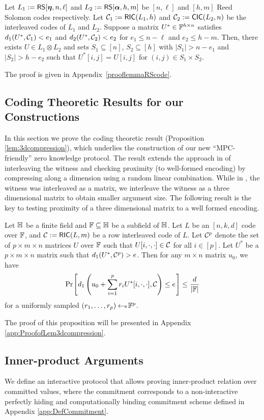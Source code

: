 \begin{lemma}\label{lem:bicdecoding}
Let $L_1 := \mathsf{RS}[\bm{\eta},n,\ell]$ and $L_2 := \mathsf{RS}[\bm{\alpha},h,m]$ be $[n,\ell]$ and
$[h,m]$ Reed Solomon codes respectively. Let $\mathcal{C}_1 := \mathsf{RIC}(L_1,h)$ and
$\mathcal{C}_2 := \mathsf{CIC}(L_2,n)$ be the interleaved codes of $L_1$ and $L_2$. Suppose
a matrix $U^\ast\in \mathbb{F}^{h\times n}$ satisfies $d_1(U^\ast,\mathcal{C}_1)<e_1$ and
$d_2(U^\ast,\mathcal{C}_2)<e_2$ for $e_1\leq n-\ell$ and $e_2\leq h-m$.
Then, there exists $U\in L_1\otimes L_2$ and sets
$S_1\subseteq [n]$, $S_2\subseteq [h]$ with $|S_1|>n-e_1$ and $|S_2|>h-e_2$ such
that $U^\ast[i,j]=U[i,j]$ for $(i,j)\in S_1\times S_2$.
\end{lemma}
The proof is given in Appendix~\ref{prooflemmaRScode}.

 

\subsection{Coding Theoretic Results for our Constructions}
In this section we prove the coding theoretic result (Proposition \ref{lem:3dcompression}), which underlies
the construction of our new ``MPC-friendly'' zero knowledge protocol. The result
extends the approach in \cite{ligero}  of interleaving the witness and checking proximity (to well-formed encoding) by
compressing along a dimension using a random linear combination. 
While in \cite{ligero}, the witness was interleaved as a matrix,
we interleave the witness as a three dimensional matrix to obtain smaller
argument size. The following result is the key to testing proximity of a three
dimensional matrix to a well formed encoding.
\begin{proposition}[3D Compression]\label{lem:3dcompression}
Let $\mathbb{H}$ be a finite field and $\mathbb{F}\subseteq \mathbb{H}$ be a subfield of $\mathbb{H}$. Let $L$ be an $[n,k,d]$ code over $\mathbb{F}$, and $\mathcal{C} :=
\mathsf{RIC}(L,m)$ be a row interleaved code of $L$. Let $\mathcal{C}^p$ denote the set of
$p\times m\times n$ matrices $U$ over $\mathbb{F}$ such that $U[i,\cdot,\cdot]\in
\mathcal{C}$ for all $i\in [p]$. Let $U^\ast$ be a
$p\times m\times n$ matrix such that $d_1(U^\ast,\mathcal{C}^p)>e$. Then for any
$m\times n$ matrix $u_0$, we have 
\[ \prob{d_1\left(u_0 + \sum_{i=1}^p r_iU^\ast[i,\cdot,\cdot], \mc{C}\right)\leq e}\leq
\frac{d}{|\FF|}\]  
for a uniformly sampled $(r_1,\ldots,r_p)\hskip2.3pt{\gets\!\!\mbox{\tiny${\$}$\normalsize}}\, \mathbb{F}^p$. 
\end{proposition}
The proof of this proposition will be presented in Appendix \ref{app:ProofofLem3dcompression}.

\subsection{Inner-product Arguments}
We define an interactive protocol that allows proving inner-product relation over committed values, where the commitment corresponds to a non-interactive perfectly hiding and computationally binding commitment scheme defined in Appendix \ref{app:DefCommitment}. %

